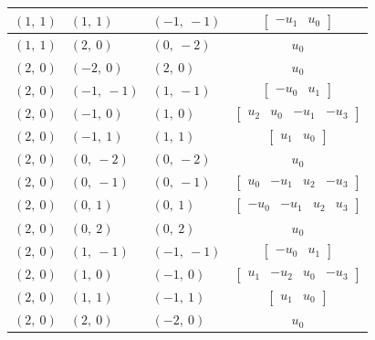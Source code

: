 \documentclass[11pt]{article}
\theoremstyle{definition}
\begin{document}
\begin{longtable}{|l|l|l|c|}
    \hline
    $\left( 1, \  1\right)$ & $\left( 1, \  1\right)$ & $\left( -1, \  -1\right)$ & $\left[\begin{matrix}- u_{1} & u_{0}\end{matrix}\right]$ \\
    \hline
    $\left( 1, \  1\right)$ & $\left( 2, \  0\right)$ & $\left( 0, \  -2\right)$ & $u_{0}$ \\
    \hline
    $\left( 2, \  0\right)$ & $\left( -2, \  0\right)$ & $\left( 2, \  0\right)$ & $u_{0}$ \\
    \hline
    $\left( 2, \  0\right)$ & $\left( -1, \  -1\right)$ & $\left( 1, \  -1\right)$ & $\left[\begin{matrix}- u_{0} & u_{1}\end{matrix}\right]$ \\
    \hline
    $\left( 2, \  0\right)$ & $\left( -1, \  0\right)$ & $\left( 1, \  0\right)$ & $\left[\begin{matrix}u_{2} & u_{0} & - u_{1} & - u_{3}\end{matrix}\right]$ \\
    \hline
    $\left( 2, \  0\right)$ & $\left( -1, \  1\right)$ & $\left( 1, \  1\right)$ & $\left[\begin{matrix}u_{1} & u_{0}\end{matrix}\right]$ \\
    \hline
    $\left( 2, \  0\right)$ & $\left( 0, \  -2\right)$ & $\left( 0, \  -2\right)$ & $u_{0}$ \\
    \hline
    $\left( 2, \  0\right)$ & $\left( 0, \  -1\right)$ & $\left( 0, \  -1\right)$ & $\left[\begin{matrix}u_{0} & - u_{1} & u_{2} & - u_{3}\end{matrix}\right]$ \\
    \hline
    $\left( 2, \  0\right)$ & $\left( 0, \  1\right)$ & $\left( 0, \  1\right)$ & $\left[\begin{matrix}- u_{0} & - u_{1} & u_{2} & u_{3}\end{matrix}\right]$ \\
    \hline
    $\left( 2, \  0\right)$ & $\left( 0, \  2\right)$ & $\left( 0, \  2\right)$ & $u_{0}$ \\
    \hline
    $\left( 2, \  0\right)$ & $\left( 1, \  -1\right)$ & $\left( -1, \  -1\right)$ & $\left[\begin{matrix}- u_{0} & u_{1}\end{matrix}\right]$ \\
    \hline
    $\left( 2, \  0\right)$ & $\left( 1, \  0\right)$ & $\left( -1, \  0\right)$ & $\left[\begin{matrix}u_{1} & - u_{2} & u_{0} & - u_{3}\end{matrix}\right]$ \\
    \hline
    $\left( 2, \  0\right)$ & $\left( 1, \  1\right)$ & $\left( -1, \  1\right)$ & $\left[\begin{matrix}u_{1} & u_{0}\end{matrix}\right]$ \\
    \hline
    $\left( 2, \  0\right)$ & $\left( 2, \  0\right)$ & $\left( -2, \  0\right)$ & $u_{0}$ \\
    \hline
\end{longtable}
\end{document}
